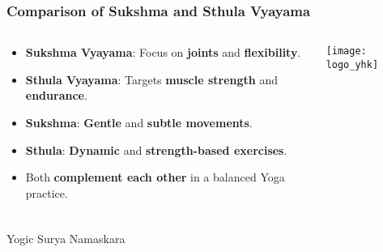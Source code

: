 \begin{frame}[fragile]\frametitle{Comparison of Sukshma and Sthula Vyayama}
\begin{columns}
    \begin{column}[T]{0.5\linewidth}
      \begin{itemize}
        \item \textbf{Sukshma Vyayama}: Focus on \textbf{joints} and \textbf{flexibility}.
        \item \textbf{Sthula Vyayama}: Targets \textbf{muscle strength} and \textbf{endurance}.
        \item \textbf{Sukshma}: \textbf{Gentle} and \textbf{subtle movements}.
        \item \textbf{Sthula}: \textbf{Dynamic} and \textbf{strength-based exercises}.
        \item Both \textbf{complement each other} in a balanced Yoga practice.
      \end{itemize}
    \end{column}
    \begin{column}[T]{0.5\linewidth}
        \begin{center}
        \texttt{[image: logo\_yhk]}
        \end{center}	
    \end{column}
\end{columns}
\end{frame}


\begin{frame}[fragile]\frametitle{}
\begin{center}
{\Large Yogic Surya Namaskara}
\end{center}
\end{frame}

